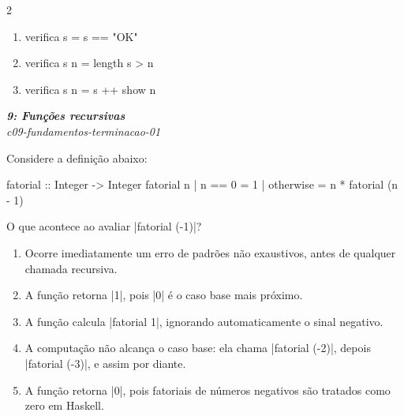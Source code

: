 \documentclass[a4paper,10pt,brazil]{article}
\begin{document}
\begin{multicols}{2}
\begin{enumerate}
  \item \begin{haskellcode}
verifica s = s == "OK"
\end{haskellcode}

  \item \begin{haskellcode}
verifica s n = length s > n
\end{haskellcode}

  \item \begin{haskellcode}
verifica s n = s ++ show n
\end{haskellcode}


\end{enumerate}

\begin{flushright}
  \footnotesize
  \textit{\textbf{9: Funções recursivas}}\\
  \textit{c09-fundamentos-terminacao-01}\\

\end{flushright}
Considere a definição abaixo:
\begin{haskellcode}
fatorial :: Integer -> Integer
fatorial n
  | n == 0 = 1
  | otherwise = n * fatorial (n - 1)
\end{haskellcode}
O que acontece ao avaliar \haskellinline|fatorial (-1)|?

\begin{enumerate}
  \item Ocorre imediatamente um erro de padrões não exaustivos, antes de qualquer chamada recursiva.

  \item A função retorna \haskellinline|1|, pois \haskellinline|0| é o caso base mais próximo.

  \item A função calcula \haskellinline|fatorial 1|, ignorando automaticamente o sinal negativo.

  \item A computação não alcança o caso base: ela chama \haskellinline|fatorial (-2)|, depois \haskellinline|fatorial (-3)|, e assim por diante.

  \item A função retorna \haskellinline|0|, pois fatoriais de números negativos são tratados como zero em Haskell.


\end{enumerate}


\end{multicols}
\end{document}
